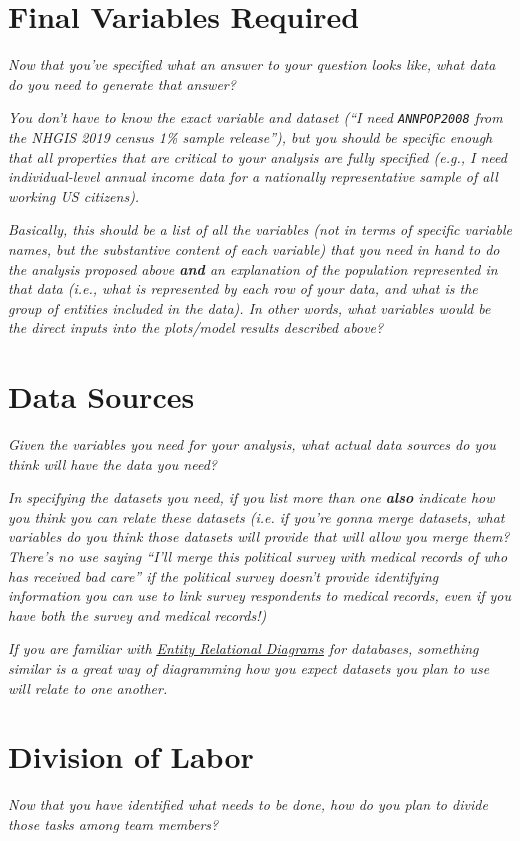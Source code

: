 \documentclass[12pt]{article}
\begin{document}
\section{Final Variables Required}

\emph{Now that you've specified what an answer to your question looks like, what data do you need to generate that answer?}

\emph{You don't have to know the exact variable and dataset (``I need \texttt{ANNPOP2008} from the NHGIS 2019 census 1\% sample release''), but you should be specific enough that all properties that are critical to your analysis are fully specified (e.g., I need individual-level annual income data for a nationally representative sample of all working US citizens).}

\emph{Basically, this should be a list of all the variables (not in terms of specific variable names, but the substantive content of each variable) that you need in hand to do the analysis proposed above \textbf{and} an explanation of the population represented in that data (i.e., what is represented by each row of your data, and what is the group of entities included in the data). In other words, what variables would be the direct inputs into the plots/model results described above?}


\pagebreak
\section{Data Sources}

\emph{Given the variables you need for your analysis, what actual data sources do you think will have the data you need?}

\emph{In specifying the datasets you need, if you list more than one \textbf{also} indicate how you think you can relate these datasets (i.e. if you're gonna merge datasets, what variables do you think those datasets will provide that will allow you merge them? There's no use saying ``I'll merge this political survey with medical records of who has received bad care'' if the political survey doesn't provide identifying information you can use to link survey respondents to medical records, even if you have both the survey and medical records!)}

\emph{If you are familiar with \href{https://www.visual-paradigm.com/guide/data-modeling/what-is-entity-relationship-diagram/}{\underline{Entity Relational Diagrams}} for databases, something similar is a great way of diagramming how you expect datasets you plan to use will relate to one another.}
\vspace*{8cm}\\

\section{Division of Labor}

\emph{Now that you have identified what needs to be done, how do you plan to divide those tasks among team members?}
\end{document}
